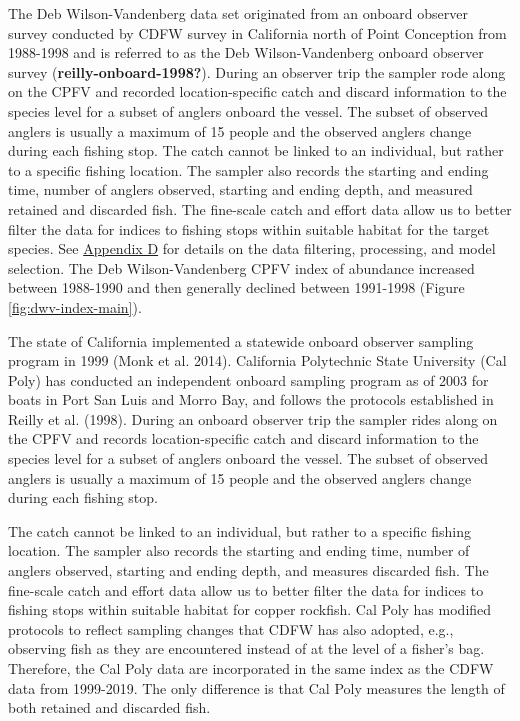 \documentclass[11pt,
  english,
  letterpaper,
]{article}
\begin{document}
The Deb Wilson-Vandenberg data set originated from an onboard observer survey conducted by CDFW survey in California north of Point Conception from 1988-1998 and is referred to as the Deb Wilson-Vandenberg onboard observer survey (\textbf{reilly-onboard-1998?}). During an observer trip the sampler rode along on the CPFV and recorded location-specific catch and discard information to the species level for a subset of anglers onboard the vessel. The subset of observed anglers is usually a maximum of 15 people and the observed anglers change during each fishing stop. The catch cannot be linked to an individual, but rather to a specific fishing location. The sampler also records the starting and ending time, number of anglers observed, starting and ending depth, and measured retained and discarded fish. The fine-scale catch and effort data allow us to better filter the data for indices to fishing stops within suitable habitat for the target species. See \protect\hyperlink{dwv-cpfv-index}{Appendix D} for details on the data filtering, processing, and model selection. The Deb Wilson-Vandenberg CPFV index of abundance increased between 1988-1990 and then generally declined between 1991-1998 (Figure \ref{fig:dwv-index-main}).

The state of California implemented a statewide onboard observer sampling program in 1999 (Monk et al. 2014). California Polytechnic State University (Cal Poly) has conducted an independent onboard sampling program as of 2003 for boats in Port San Luis and Morro Bay, and follows the protocols established in Reilly et al. (1998). During an onboard observer trip the sampler rides along on the CPFV and records location-specific catch and discard information to the species level for a subset of anglers onboard the vessel. The subset of observed anglers is usually a maximum of 15 people and the observed anglers change during each fishing stop.

The catch cannot be linked to an individual, but rather to a specific fishing location. The sampler also records the starting and ending time, number of anglers observed, starting and ending depth, and measures discarded fish. The fine-scale catch and effort data allow us to better filter the data for indices to fishing stops within suitable habitat for copper rockfish. Cal Poly has modified protocols to reflect sampling changes that CDFW has also adopted, e.g., observing fish as they are encountered instead of at the level of a fisher's bag. Therefore, the Cal Poly data are incorporated in the same index as the CDFW data from 1999-2019. The only difference is that Cal Poly measures the length of both retained and discarded fish.
\end{document}
